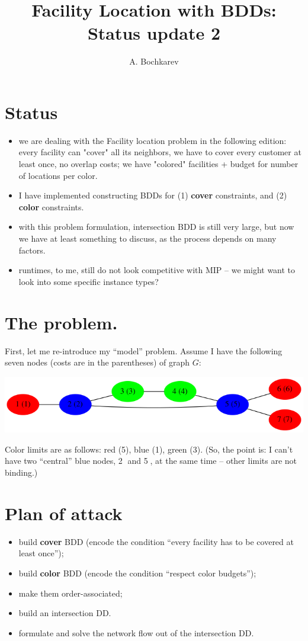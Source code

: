 \documentclass[11pt]{article}
\author{A. Bochkarev}
\date{}
\title{Facility Location with BDDs: Status update 2}
\begin{document}
\maketitle

\section{Status}
\label{sec:org7d8711a}
\begin{itemize}
\item we are dealing with the Facility location problem in the following edition: every facility can
"cover" all its neighbors, we have to cover every customer at least once, no
overlap costs; we have "colored" facilities + budget for number of locations
per color.
\item I have implemented constructing BDDs for (1) \textbf{cover} constraints, and (2) \textbf{color} constraints.
\item with this problem formulation, intersection BDD is still very large, but now
we have at least something to discuss, as the process depends on many factors.
\item runtimes, to me, still do not look competitive with MIP -- we might want to
look into some specific instance types?
\end{itemize}

\section{The problem.}
\label{sec:org6c7933c}
First, let me re-introduce my ``model'' problem. Assume I have the following
seven nodes (costs are in the parentheses) of graph \(G\):
\begin{center}
\includegraphics[width=.9\linewidth]{problem_LR.png}
\end{center}

Color limits are as follows: red (5), blue (1), green (3). (So, the point is: I
can't have two ``central'' blue nodes, \textcircled{2} and \textcircled{5}, at the
same time -- other limits are not binding.)

\section{Plan of attack}
\label{sec:org6f4a2a7}
\begin{itemize}
\item build \textbf{cover} BDD (encode the condition ``every facility has to be covered at least once'');
\item build \textbf{color} BDD (encode the condition ``respect color budgets'');
\item make them order-associated;
\item build an intersection DD.
\item formulate and solve the network flow out of the intersection DD.
\end{itemize}
\end{document}
